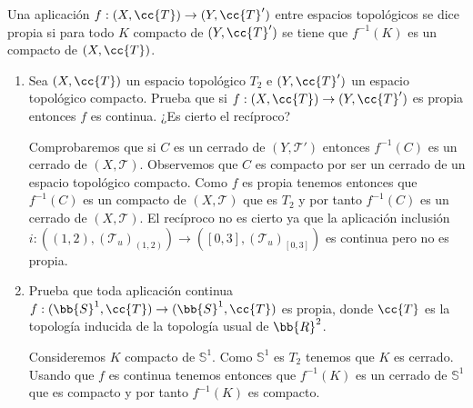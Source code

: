 \documentclass[12pt]{article}
\begin{document}
    \begin{ejercicio}
        Una aplicación $f : (X, \cc{T}) \to (Y, \cc{T}')$ entre espacios topológicos se dice propia si para todo $K$ compacto de $(Y, \cc{T}')$ se tiene que $f^{-1}(K)$ es un compacto de $(X, \cc{T})$.
        \begin{enumerate}[label=\alph*)]
            \item Sea $(X, \cc{T})$ un espacio topológico $T_2$ e $(Y, \cc{T}')$ un espacio topológico compacto. Prueba que si $f : (X, \cc{T}) \to (Y, \cc{T}')$ es propia entonces $f$ es continua. ¿Es cierto el recíproco?
            
                Comprobaremos que si $C$ es un cerrado de $(Y, \mathcal{T}')$ entonces $f^{-1}(C)$ es un cerrado de $(X, \mathcal{T})$. Observemos que $C$ es compacto por ser un cerrado de un espacio topológico compacto. Como $f$ es propia tenemos entonces que $f^{-1}(C)$ es un compacto de $(X, \mathcal{T})$ que es $T_2$ y por tanto $f^{-1}(C)$ es un cerrado de $(X, \mathcal{T})$. El recíproco no es cierto ya que la aplicación inclusión $i: ((1, 2), (\mathcal{T}_u)_{(1,2)}) \rightarrow ([0, 3], (\mathcal{T}_u)_{[0,3]})$ es continua pero no es propia.
                
            \item Prueba que toda aplicación continua $f : (\bb{S}^1, \cc{T}) \to (\bb{S}^1, \cc{T})$ es propia, donde $\cc{T}$ es la topología inducida de la topología usual de $\bb{R}^2$.
            
                Consideremos $K$ compacto de $\mathbb{S}^1$. Como $\mathbb{S}^1$ es $T_2$ tenemos que $K$ es cerrado. Usando que $f$ es continua tenemos entonces que $f^{-1}(K)$ es un cerrado de $\mathbb{S}^1$ que es compacto y por tanto $f^{-1}(K)$ es compacto.
        \end{enumerate}
    \end{ejercicio}
\end{document}
